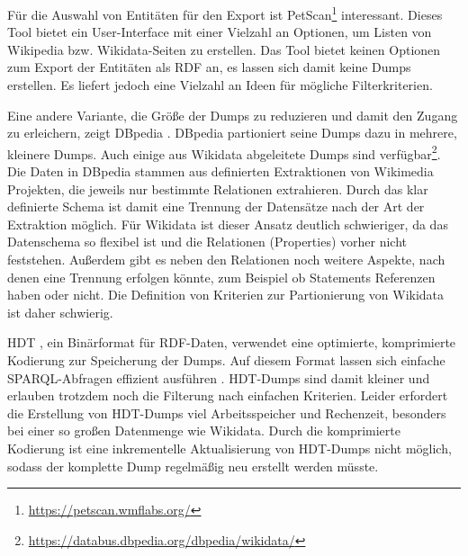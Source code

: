 Für die Auswahl von Entitäten für den Export ist PetScan\footnote{\url{https://petscan.wmflabs.org/}} interessant.
Dieses Tool bietet ein User-Interface mit einer Vielzahl an Optionen, um Listen von Wikipedia bzw. Wikidata-Seiten zu erstellen. 
Das Tool bietet keinen Optionen zum Export der Entitäten als RDF an, es lassen sich damit keine Dumps erstellen.
Es liefert jedoch eine Vielzahl an Ideen für mögliche Filterkriterien.

Eine andere Variante, die Größe der Dumps zu reduzieren und damit den Zugang zu erleichern, zeigt DBpedia \cite{dbpedia}.
DBpedia partioniert seine Dumps dazu in mehrere, kleinere Dumps.
Auch einige aus Wikidata abgeleitete Dumps sind verfügbar\footnote{\url{https://databus.dbpedia.org/dbpedia/wikidata/}}.
Die Daten in DBpedia stammen aus definierten Extraktionen von Wikimedia Projekten, die jeweils nur bestimmte Relationen extrahieren.
Durch das klar definierte Schema ist damit eine Trennung der Datensätze nach der Art der Extraktion möglich.
Für Wikidata ist dieser Ansatz deutlich schwieriger, da das Datenschema so flexibel ist und die Relationen (Properties) vorher nicht feststehen.
Außerdem gibt es neben den Relationen noch weitere Aspekte, nach denen eine Trennung erfolgen könnte, zum Beispiel ob Statements Referenzen haben oder nicht.
Die Definition von Kriterien zur Partionierung von Wikidata ist daher schwierig.

HDT \cite{hdt}, ein Binärformat für RDF-Daten, verwendet eine optimierte, komprimierte Kodierung zur Speicherung der Dumps.
Auf diesem Format lassen sich einfache SPARQL-Abfragen effizient ausführen \cite{hdt-query}.
HDT-Dumps sind damit kleiner und erlauben trotzdem noch die Filterung nach einfachen Kriterien.
Leider erfordert die Erstellung von HDT-Dumps viel Arbeitsspeicher und Rechenzeit, besonders bei einer so großen Datenmenge wie Wikidata.
Durch die komprimierte Kodierung ist eine inkrementelle Aktualisierung von HDT-Dumps nicht möglich, sodass der komplette Dump regelmäßig neu erstellt werden müsste.

